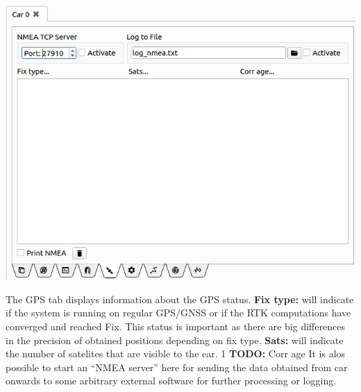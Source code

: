 \documentclass[12pt]{article} %
\def\printtodos{0}
\newcommand{\todo}[1]{
  \if\printtodos1
      {\color{red} \textbf{TODO:} #1}
  \fi}
\begin{document}
\noindent\begin{minipage}{0.5\textwidth}
  \noindent \includegraphics[width=\textwidth]{./screens/Car_GPS.png}
\end{minipage}
\begin{minipage}{0.5\textwidth} %
   The GPS tab displays information about the GPS
  status. {\bf Fix type:} will indicate if the system is running on
  regular GPS/GNSS or if the RTK computations have converged and
  reached Fix. This status is important as there are big differences
  in the precision of obtained positions depending on fix type. {\bf Sats:} will indicate
  the number of satelites that are visible to the car. \todo{Corr age}
  It is alos possible to start an ``NMEA server'' here for sending the
  data obtained from car onwards to some arbitrary external software
  for further processing or logging.
\end{minipage}
\end{document}
